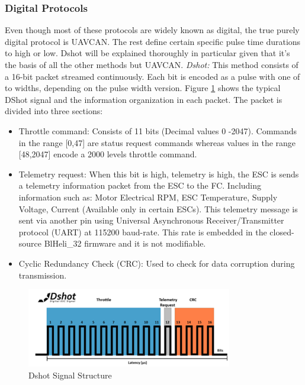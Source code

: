 \subsubsection{Digital Protocols} \label{sec: esc_dig_prot}
Even though most of these protocols are widely known as digital, the true purely digital protocol is UAVCAN. The rest define certain specific pulse time durations to high or low. Dshot will be explained thoroughly in particular given that it's the basis of all the other methods but UAVCAN.
\newline
\textit{Dshot: } This method consists of a 16-bit packet streamed continuously. Each bit is encoded as a pulse with one of to widths, depending on the pulse width version. Figure \ref{fig:dshot} shows the typical DShot signal and the information organization in each packet. The packet is divided into three sections: 
\begin{itemize}
    \item Throttle command: Consists of 11 bits (Decimal values 0 -2047). Commands in the range [0,47] are status request commands whereas values in the range [48,2047] encode a 2000 levels throttle command.
    \item Telemetry request: When this bit is high, telemetry is high, the ESC is sends a telemetry information packet from the ESC to the FC. Including information such as: Motor Electrical RPM, ESC Temperature, Supply Voltage, Current (Available only in certain ESCs). This telemetry message is sent via another pin using Universal Asynchronous Receiver/Transmitter protocol (UART) at 115200 baud-rate. This rate is embedded in the closed-source BlHeli\_32 firmware and it is not modifiable.
    \item Cyclic Redundancy Check (CRC): Used to check for data corruption during transmission.
\end{itemize}

\begin{figure}
    \centering
    \includegraphics[width=0.8\textwidth]{images/dshot_sketch.png}
    \caption{Dshot Signal Structure \cite{Speedgoat2020}}
    \label{fig:dshot}
\end{figure}

